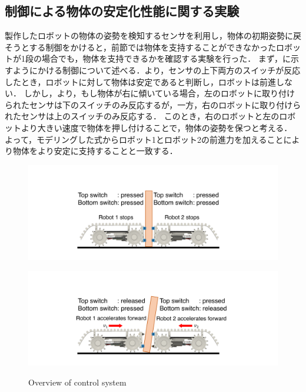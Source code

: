 \subsection{制御による物体の安定化性能に関する実験}
製作したロボットの物体の姿勢を検知するセンサを利用し，物体の初期姿勢に戻そうとする制御をかけると，前節では物体を支持することができなかったロボットが1段の場合でも，物体を支持できるかを確認する実験を行った．
まず，に示すようにかける制御について述べる．より，センサの上下両方のスイッチが反応したとき，ロボットに対して物体は安定であると判断し，ロボットは前進しない．
しかし，より，もし物体が右に傾いている場合，左のロボットに取り付けられたセンサは下のスイッチのみ反応するが，一方，右のロボットに取り付けられたセンサは上のスイッチのみ反応する．
このとき，右のロボットと左のロボットより大きい速度で物体を押し付けることで，物体の姿勢を保つと考える．
よって，モデリングした式からロボット1とロボット2の前進力を加えることにより物体をより安定に支持することと一致する．
\begin{figure}[tb]
  \begin{minipage}[b]{0.485\columnwidth}
  \centering
  \includegraphics[width=\columnwidth]{figures/control-upright-v3.pdf}
  \label{fig:upright}
 \end{minipage}%
 \begin{minipage}[b]{0.51\columnwidth}
  \centering
  \includegraphics[width=\columnwidth]{figures/control-tilted-v3.pdf}
  \label{fig:tilted}
 \end{minipage}
 \caption{Overview of control system}
 \label{fig:control-figure}
\end{figure}
